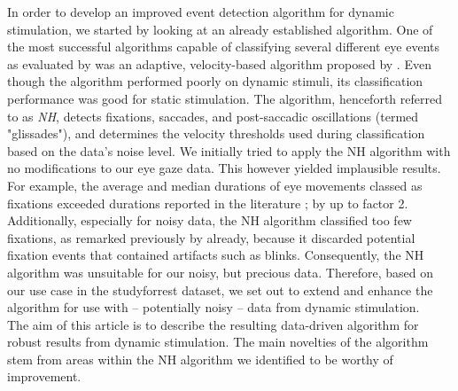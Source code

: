 In order to develop an improved event detection algorithm for dynamic stimulation, we started by looking at an already established algorithm. One of the most successful algorithms capable of classifying several different eye events as evaluated by \citet{Andersson2017} was an adaptive, velocity-based algorithm proposed by \citet{Nystrom2010AnData}. Even though the algorithm performed poorly on dynamic stimuli, its classification performance was good for static stimulation. The algorithm, henceforth referred to as \textit{NH}, detects fixations, saccades, and post-saccadic oscillations (termed "glissades"), and determines the velocity thresholds used during classification based on the data's noise level. We initially tried to apply the NH algorithm with no modifications to our eye gaze data. This however yielded implausible results. For example, the average and median durations of eye movements classed as fixations exceeded durations reported in the literature \citep{holmqvist2011eye}; \citep{dorr2010variability} \citep{holmqvist2011eye}  by up to factor 2. Additionally, especially for noisy data, the NH algorithm classified too few fixations, as remarked previously by \citet{Friedman2018} already, because it discarded potential fixation events that contained artifacts such as blinks. Consequently, the NH algorithm was unsuitable for our noisy, but precious data. Therefore, based on our use case in the studyforrest dataset, we set out to extend and enhance the algorithm for use with -- potentially noisy -- data from dynamic stimulation. \\
The aim of this article is to describe the resulting data-driven algorithm for robust results from dynamic stimulation. The main novelties of the algorithm stem from areas within the NH algorithm we identified to be worthy of improvement. \\
